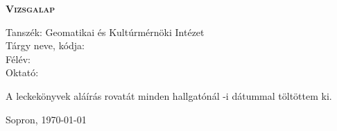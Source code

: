 \documentclass[a4paper,12pt]{article}
\begin{document}
\pagestyle{empty}
\newlength{\alair}
\settowidth{\alair}{Dr. Gribovszki Zoltán}


\begin{center}
\scshape \bfseries
  Vizsgalap
\end{center}

\noindent Tanszék: Geomatikai és Kultúrmérnöki Intézet \\
Tárgy neve, kódja: \targy \\
Félév: \felev\\
Oktató: \nev

A leckekönyvek aláírás rovatát minden hallgatónál \indexalair{}-i dátummal töltöttem ki.
   


\noindent Sopron, \today{} %

\begin{flushright}
\begin{minipage}{\alair}
\centering
\nev\\
\beosztas\\
\oktazon
\end{minipage}
\end{flushright}
\end{document}
